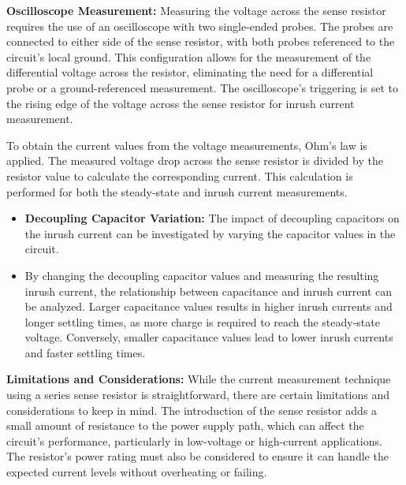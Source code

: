 \documentclass[a4paper,11pt]{article}%
\begin{document}
\textbf{Oscilloscope Measurement:} Measuring the voltage across the sense resistor requires the use of an oscilloscope with two single-ended probes. The probes are connected to either side of the sense resistor, with both probes referenced to the circuit's local ground. This configuration allows for the measurement of the differential voltage across the resistor, eliminating the need for a differential probe or a ground-referenced measurement. The oscilloscope's triggering is set to the rising edge of the voltage across the sense resistor for inrush current measurement.

To obtain the current values from the voltage measurements, Ohm's law is applied. The measured voltage drop across the sense resistor is divided by the resistor value to calculate the corresponding current. This calculation is performed for both the steady-state and inrush current measurements.
\begin{itemize}
	\item \textbf{Decoupling Capacitor Variation:} The impact of decoupling capacitors on the inrush current can be investigated by varying the capacitor values in the circuit.
	\item By changing the decoupling capacitor values and measuring the resulting inrush current, the relationship between capacitance and inrush current can be analyzed. Larger capacitance values results in higher inrush currents and longer settling times, as more charge is required to reach the steady-state voltage. Conversely, smaller capacitance values lead to lower inrush currents and faster settling times.
\end{itemize}




\textbf{Limitations and Considerations:} While the current measurement technique using a series sense resistor is straightforward, there are certain limitations and considerations to keep in mind. The introduction of the sense resistor adds a small amount of resistance to the power supply path, which can affect the circuit's performance, particularly in low-voltage or high-current applications. The resistor's power rating must also be considered to ensure it can handle the expected current levels without overheating or failing.
\end{document}
